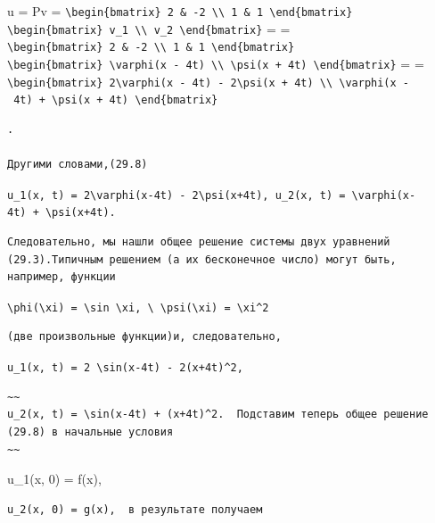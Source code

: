 \documentclass[
  ukrainian,
]{article}
\begin{document}
u = Pv =
\texttt{\textbackslash{}begin\{bmatrix\}\ 2\ \&\ -2\ \textbackslash{}\textbackslash{}\ 1\ \&\ 1\ \textbackslash{}end\{bmatrix\}}
\texttt{\textbackslash{}begin\{bmatrix\}\ v\_1\ \textbackslash{}\textbackslash{}\ v\_2\ \textbackslash{}end\{bmatrix\}}
= =
\texttt{\textbackslash{}begin\{bmatrix\}\ 2\ \&\ -2\ \textbackslash{}\textbackslash{}\ 1\ \&\ 1\ \textbackslash{}end\{bmatrix\}}
\texttt{\textbackslash{}begin\{bmatrix\}\ \textbackslash{}varphi(x\ -\ 4t)\ \textbackslash{}\textbackslash{}\ \textbackslash{}psi(x\ +\ 4t)\ \textbackslash{}end\{bmatrix\}}
= =
\texttt{\textbackslash{}begin\{bmatrix\}\ 2\textbackslash{}varphi(x\ -\ 4t)\ -\ 2\textbackslash{}psi(x\ +\ 4t)\ \textbackslash{}\textbackslash{}\ \textbackslash{}varphi(x\ -\ 4t)\ +\ \textbackslash{}psi(x\ +\ 4t)\ \textbackslash{}end\{bmatrix\}}

\begin{verbatim}
.

Другими словами,(29.8)
\end{verbatim}

\texttt{u\_1(x,\ t)\ =\ 2\textbackslash{}varphi(x-4t)\ -\ 2\textbackslash{}psi(x+4t),\ u\_2(x,\ t)\ =\ \textbackslash{}varphi(x-4t)\ +\ \textbackslash{}psi(x+4t).}

\begin{verbatim}
Следовательно, мы нашли общее решение системы двух уравнений (29.3).Типичным решением (а их бесконечное число) могут быть, например, функции
\end{verbatim}

\texttt{\textbackslash{}phi(\textbackslash{}xi)\ =\ \textbackslash{}sin\ \textbackslash{}xi,\ \textbackslash{}\ \textbackslash{}psi(\textbackslash{}xi)\ =\ \textbackslash{}xi\^{}2}

\begin{verbatim}
(две произвольные функции)и, следовательно,
\end{verbatim}

\texttt{u\_1(x,\ t)\ =\ 2\ \textbackslash{}sin(x-4t)\ -\ 2(x+4t)\^{}2,}

\begin{verbatim}
~~
u_2(x, t) = \sin(x-4t) + (x+4t)^2.  Подставим теперь общее решение (29.8) в начальные условия
~~
\end{verbatim}

u\_1(x, 0) = f(x),

\begin{verbatim}
u_2(x, 0) = g(x),  в результате получаем
\end{verbatim}
\end{document}
